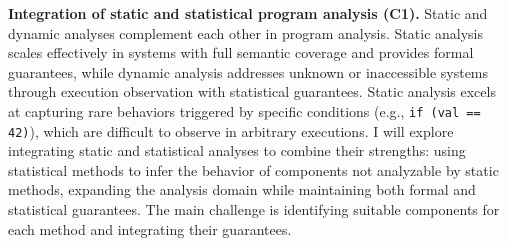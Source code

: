\documentclass{article}
\begin{document}
\vspace{0.5em}
\noindent\textbf{Integration of static and statistical program analysis (C1).}
Static and dynamic analyses complement each other in program analysis. Static analysis scales effectively in systems with full semantic coverage and provides formal guarantees, while dynamic analysis addresses unknown or inaccessible systems through execution observation with statistical guarantees. Static analysis excels at capturing rare behaviors triggered by specific conditions (e.g., \texttt{if (val == 42)}), which are difficult to observe in arbitrary executions. I will explore integrating static and statistical analyses to combine their strengths: using statistical methods to infer the behavior of components not analyzable by static methods, expanding the analysis domain while maintaining both formal and statistical guarantees. The main challenge is identifying suitable components for each method and integrating their guarantees.

{\small


}
\end{document}
